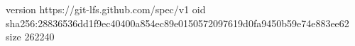 version https://git-lfs.github.com/spec/v1
oid sha256:28836536dd1f9ec40400a854ec89e0150572097619d0fa9450b59e74e883ee62
size 262240
